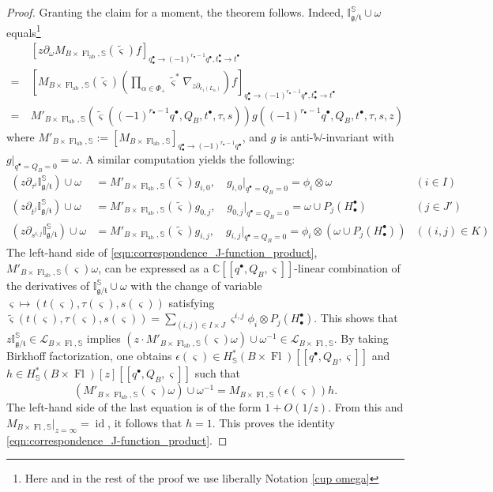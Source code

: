 \documentclass[a4paper,12pt]{amsart}
\numberwithin{equation}{section}
\theoremstyle{definition}
\newcommand{\C}{\mathbb{C}}
\newcommand{\I}{\mathbb{I}}
\newcommand{\bbS}{\mathbb{S}}
\newcommand{\W}{\mathbb{W}}
\newcommand{\cL}{\mathcal{L}}
\newcommand{\gt}{{\mathfrak{g}/\mathfrak{t}}}
\newcommand{\newsigma}{\varsigma}
\newcommand{\Fl}{\operatorname{Fl}}
\newcommand{\FlT}{\operatorname{Fl}_{\operatorname{ab}}}
\begin{document}
\begin{proof}
\vspace{10pt}
\noindent Granting the claim for a moment, the theorem follows. 
    Indeed, $\I_\gt^\bbS\cup\omega$ equals\footnote{Here and in the rest of the proof we use liberally Notation \ref{cup omega}}
    \begin{align*}
        &[z\partial_\omega M_{B\times\FlT,\bbS}(\widetilde{\newsigma})f]_{q^\bullet_\bullet\to (-1)^{r_\bullet-1}q^\bullet,t^\bullet_\bullet\to t^\bullet} \\
        =\ &\left[M_{B\times\FlT,\bbS}(\widetilde{\newsigma}) \left(\prod_{\alpha\in\Phi_+}\widetilde{\newsigma}^*\nabla_{z\partial_{c_1(L_\alpha)}}\right)f\right]_{q^\bullet_\bullet\to (-1)^{r_\bullet-1}q^\bullet,t^\bullet_\bullet\to t^\bullet} \\
        =\ &M'_{B\times\FlT,\bbS}(\widetilde{\newsigma}((-1)^{r_\bullet-1}q^\bullet,Q_B,t^\bullet,\tau,s)) g((-1)^{r_\bullet-1}q^\bullet,Q_B,t^\bullet,\tau,s,z)
    \end{align*}
    where $M'_{B\times\FlT,\bbS}:=[M_{B\times\FlT,\bbS}]_{q^\bullet_\bullet\to (-1)^{r_\bullet-1}q^\bullet}$, and $g$ is anti-$\W$-invariant with $g|_{q^\bullet=Q_B=0}=\omega$.
    A similar computation yields the following:
    \begin{align*}
        (z\partial_{\tau^i}\I_\gt^\bbS)\cup\omega &= M'_{B\times\FlT,\bbS}(\widetilde{\newsigma}) g_{i,0}, \quad g_{i,0}|_{q^\bullet=Q_B=0} = \phi_i\otimes\omega &(i\in I) \\
        (z\partial_{t^{j}}\I_\gt^\bbS)\cup\omega &= M'_{B\times\FlT,\bbS}(\widetilde{\newsigma}) g_{0,j}, \quad g_{0,j}|_{q^\bullet=Q_B=0} = \omega \cup P_j(H^\bullet_\bullet) &(j\in J') \\
        (z\partial_{s^{i,j}}\I_\gt^\bbS)\cup\omega &= M'_{B\times\FlT,\bbS}(\widetilde{\newsigma}) g_{i,j}, \quad g_{i,j}|_{q^\bullet=Q_B=0} = \phi_i\otimes(\omega \cup P_j(H^\bullet_\bullet)) &((i,j)\in K)
    \end{align*}
    The left-hand side of \eqref{eqn:correspondence_J-function_product}, $M'_{B\times\FlT,\bbS}(\newsigma)\omega$, can be expressed as a $\C[\![q^\bullet,Q_B,\newsigma]\!]$-linear combination of the derivatives of $\I^\bbS_\gt\cup\omega$ with the change of variable $\newsigma\mapsto(t(\newsigma), \tau(\newsigma), s(\newsigma))$ satisfying $\widetilde{\newsigma}(t(\newsigma),\tau(\newsigma),s(\newsigma))=\sum_{(i,j)\in I\times J} \newsigma^{i,j} \phi_i\otimes P_j(H_\bullet^\bullet)$.
    This shows that $z\I_\gt^\bbS\in\cL_{B\times\Fl,\bbS}$ implies $(z\cdot M'_{B\times\FlT,\bbS}(\newsigma)\omega)\cup\omega^{-1}\in\cL_{B\times\Fl,\bbS}$.
    By taking Birkhoff factorization, one obtains $\epsilon(\newsigma)\in H^*_\bbS(B\times\Fl)[\![q^\bullet,Q_B,\newsigma]\!]$ and $h\in H^*_\bbS(B\times\Fl)[z][\![q^\bullet,Q_B,\newsigma]\!]$ such that
    \[
    (M'_{B\times\FlT,\bbS}(\newsigma)\omega)\cup\omega^{-1} = M_{B\times\Fl,\bbS}(\epsilon(\newsigma))h.
    \]
    The left-hand side of the last equation is of the form $1+O(1/z)$. From this and $M_{B\times\Fl,\bbS}|_{z=\infty}=\operatorname{id}$, it follows that $h=1$. 
    This proves the identity \eqref{eqn:correspondence_J-function_product}.
    

\end{proof}
\end{document}
